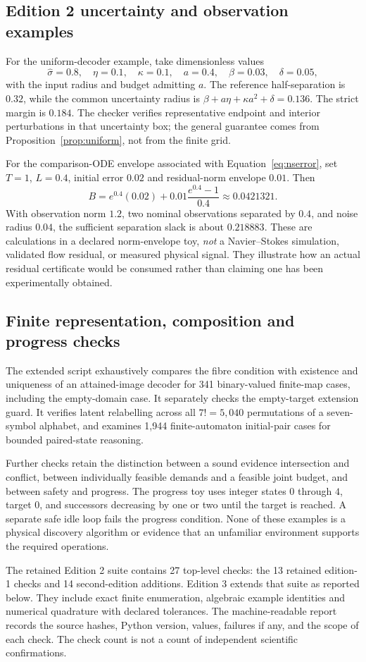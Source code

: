 \subsection{Edition 2 uncertainty and observation examples}
For the uniform-decoder example, take dimensionless values
\[
 \hat\sigma=0.8,\quad\eta=0.1,\quad\kappa=0.1,\quad
 a=0.4,\quad\beta=0.03,\quad\delta=0.05,
\]
with the input radius and budget admitting $a$. The reference half-separation is $0.32$, while the common uncertainty radius is
$\beta+a\eta+\kappa a^2+\delta=0.136$. The strict margin is $0.184$. The checker verifies representative endpoint and interior perturbations in that uncertainty box; the general guarantee comes from Proposition~\ref{prop:uniform}, not from the finite grid.

For the comparison-ODE envelope associated with Equation~\eqref{eq:nserror}, set $T=1$, $L=0.4$, initial error $0.02$ and residual-norm envelope $0.01$. Then
\[
 B=e^{0.4}(0.02)+0.01\frac{e^{0.4}-1}{0.4}\approx0.0421321.
\]
With observation norm $1.2$, two nominal observations separated by $0.4$, and noise radius $0.04$, the sufficient separation slack is about $0.218883$. These are calculations in a declared norm-envelope toy, \emph{not} a Navier--Stokes simulation, validated flow residual, or measured physical signal. They illustrate how an actual residual certificate would be consumed rather than claiming one has been experimentally obtained.

\subsection{Finite representation, composition and progress checks}
The extended script exhaustively compares the fibre condition with existence and uniqueness of an attained-image decoder for 341 binary-valued finite-map cases, including the empty-domain case. It separately checks the empty-target extension guard. It verifies latent relabelling across all $7!=5{,}040$ permutations of a seven-symbol alphabet, and examines 1,944 finite-automaton initial-pair cases for bounded paired-state reasoning.

Further checks retain the distinction between a sound evidence intersection and conflict, between individually feasible demands and a feasible joint budget, and between safety and progress. The progress toy uses integer states $0$ through $4$, target $0$, and successors decreasing by one or two until the target is reached. A separate safe idle loop fails the progress condition. None of these examples is a physical discovery algorithm or evidence that an unfamiliar environment supports the required operations.

The retained Edition 2 suite contains 27 top-level checks: the 13 retained edition-1 checks and 14 second-edition additions. Edition 3 extends that suite as reported below. They include exact finite enumeration, algebraic example identities and numerical quadrature with declared tolerances. The machine-readable report records the source hashes, Python version, values, failures if any, and the scope of each check. The check count is not a count of independent scientific confirmations.
